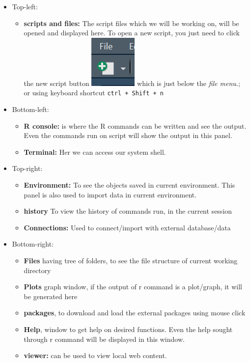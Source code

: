 \documentclass[
]{book}
\providecommand{\tightlist}{%
  \setlength{\itemsep}{0pt}\setlength{\parskip}{0pt}}
\begin{document}
\begin{itemize}
\tightlist
\item
  Top-left:

  \begin{itemize}
  \tightlist
  \item
    \textbf{scripts and files:} The script files which we will be working on, will be opened and displayed here. To open a new script, you just need to click the new script button \includegraphics{images/new_script.png} which is just below the \emph{file menu.}; or using keyboard shortcut \texttt{ctrl\ +\ Shift\ +\ n}
  \end{itemize}
\item
  Bottom-left:

  \begin{itemize}
  \tightlist
  \item
    \textbf{R console:} is where the R commands can be written and see the output. Even the commands run on script will show the output in this panel.
  \item
    \textbf{Terminal:} Her we can access our system shell.
  \end{itemize}
\item
  Top-right:

  \begin{itemize}
  \tightlist
  \item
    \textbf{Environment:} To see the objects saved in current environment. This panel is also used to import data in current environment.
  \item
    \textbf{history} To view the history of commands run, in the current session
  \item
    \textbf{Connections:} Used to connect/import with external database/data
  \end{itemize}
\item
  Bottom-right:

  \begin{itemize}
  \tightlist
  \item
    \textbf{Files} having tree of folders, to see the file structure of current working directory
  \item
    \textbf{Plots} graph window, if the output of r command is a plot/graph, it will be generated here
  \item
    \textbf{packages}, to download and load the external packages using mouse click
  \item
    \textbf{Help}, window to get help on desired functions. Even the help sought through r command will be displayed in this window.
  \item
    \textbf{viewer:} can be used to view local web content.
  \end{itemize}
\end{itemize}
\end{document}
